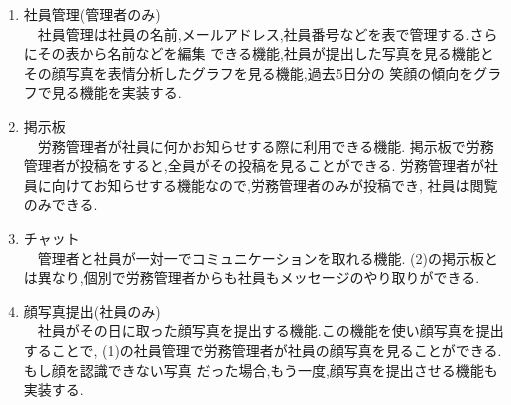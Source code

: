 \begin{enumerate}
  \item 社員管理(管理者のみ) \\
  　社員管理は社員の名前,メールアドレス,社員番号などを表で管理する.さらにその表から名前などを編集
  できる機能,社員が提出した写真を見る機能とその顔写真を表情分析したグラフを見る機能,過去5日分の
  笑顔の傾向をグラフで見る機能を実装する.  \\

  \item 掲示板 \\
  　労務管理者が社員に何かお知らせする際に利用できる機能.
  掲示板で労務管理者が投稿をすると,全員がその投稿を見ることができる.
  労務管理者が社員に向けてお知らせする機能なので,労務管理者のみが投稿でき,
  社員は閲覧のみできる. \\

  \item チャット \\
  　管理者と社員が一対一でコミュニケーションを取れる機能.
  (2)の掲示板とは異なり,個別で労務管理者からも社員もメッセージのやり取りができる. \\

  \item  顔写真提出(社員のみ) \\
  　社員がその日に取った顔写真を提出する機能.この機能を使い顔写真を提出することで,
  (1)の社員管理で労務管理者が社員の顔写真を見ることができる.もし顔を認識できない写真
  だった場合,もう一度,顔写真を提出させる機能も実装する.
\end{enumerate}

